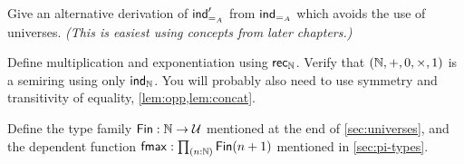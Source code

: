 \begin{solution}[Jake]
  
\end{solution}

\begin{solution}[Zack]
  
\end{solution}

\begin{ex}\label{ex:pm-to-ml}
Give an alternative derivation of $\mathsf{ind}_{=_{A}}'$ from $\mathsf{ind}_{=_{A}}$ which avoids the use of universes.
  \emph{(This is easiest using concepts from later chapters.)}
\end{ex}

\begin{solution}[Alan]
  
\end{solution}

\begin{solution}[Jake]
  
\end{solution}

\begin{ex}\label{ex:nat-semiring}
  Define multiplication and exponentiation using $\mathsf{rec}_{\mathbb{N}}$.
  Verify that $(\mathbb{N},+,0,\times,1)$ is a semiring using only $\mathsf{ind}_{\mathbb{N}}$.
  You will probably also need to use symmetry and transitivity of equality, \cref{lem:opp,lem:concat}.
\end{ex}

\begin{solution}[Steven]
  
\end{solution}

\begin{solution}[Alex]
  
\end{solution}

\begin{ex}\label{ex:fin}
  Define the type family $\mathsf{Fin} : \mathbb{N} \to \mathcal{U}$ mentioned at the end of \cref{sec:universes}, and the dependent function $\fmax : \prd{n:\nat} \Fin(n+1)$ mentioned in \cref{sec:pi-types}.
\end{ex}

\begin{solution}[Daniel]
  
\end{solution}

\begin{solution}[Zack]
  
\end{solution}

\begin{solution}[James]
  
\end{solution}

